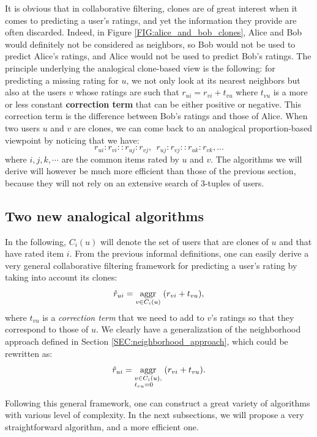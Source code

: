 It is obvious that in collaborative filtering, clones are of great interest
when it comes to predicting a user's ratings, and yet the information they provide
are often discarded. Indeed, in Figure \ref{FIG:alice_and_bob_clones}, Alice and
Bob would definitely not be considered as neighbors, so Bob would not be used to
predict Alice's ratings, and Alice would not be used to predict Bob's ratings.
The principle underlying the analogical clone-based view is the following: for
predicting a missing rating for $u$, we not only look at its nearest neighbors
but also at the users $v$ whose ratings are such that $r_{ui} = r_{vi} + t_{vu}$
where $t_{vu}$ is a more or less constant \textbf{correction term} that can be
either positive or negative. This correction term is the difference between
Bob's ratings and those of Alice. When two users $u$ and $v$ are clones, we can
come back to an analogical proportion-based viewpoint by noticing that we have:
$$r_{ui} : r_{vi} :: r_{uj} : r_{vj},~~ r_{uj} : r_{vj} :: r_{uk} : r_{vk},
\dots$$
where $i, j, k, \cdots$ are the common items rated by $u$ and $v$. The algorithms we
will derive will however be much more efficient than those of the previous
section, because they will not rely on an extensive search of 3-tuples of
users.


\subsection{Two new analogical algorithms}

In the following, $C_i(u)$ will denote the set of users that are clones of
$u$ and that have rated item $i$. From the previous informal definitions, one
can easily derive a very general collaborative filtering framework for
predicting a user's rating by taking into account its clones: $$\hat{r}_{ui} =
\underset{v \in C_i(u)}{\operatorname{aggr}}\;(r_{vi} + t_{vu}),$$
where $t_{vu}$ is a \textit{correction term} that we need to add to $v$'s
ratings so that they correspond to those of $u$. We clearly have a
generalization of the neighborhood approach defined in Section \ref{SEC:neighborhood_approach},
which could be rewritten as:
$$\hat{r}_{ui} = \underset{\begin{subarray}{l}v \in C_i(u),\\ t_{vu} = 0\end{subarray}}{\operatorname{aggr}}\;(r_{vi} + t_{vu}).$$

Following this general framework, one can construct a great variety of
algorithms with various level of complexity. In the next subsections, we will
propose a very straightforward algorithm, and a more efficient one.

